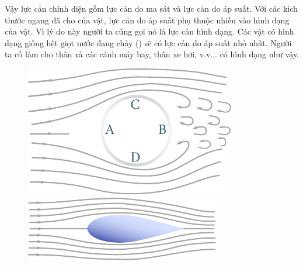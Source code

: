 
Vậy lực cản chính diện gồm lực cản do ma sát và lực cản do áp suất. Với các kích thước ngang đã cho của vật, lực cản do áp suất phụ thuộc nhiều vào hình dạng của vật. Vì lý do này người ta cũng gọi nó là lực cản hình dạng. Các vật có hình dạng giống hệt giọt nước đang chảy () sẽ có lực cản do áp suất nhỏ nhất. Người ta cố làm cho thân và các cánh máy bay, thân xe hơi, v.v... có hình dạng như vậy.

\begin{figure}[!htb]
	\begin{minipage}[t]{0.5\linewidth}
		\begin{center}
			\includegraphics[scale=1.0]{figures/ch_09/fig_9_16.pdf}
			\caption[]{}
			\label{fig:9_16}
		\end{center}
	\end{minipage}
	\hspace{-0.0cm}
	\begin{minipage}[t]{0.5\linewidth}
		\begin{center}
			\includegraphics[scale=1.0]{figures/ch_09/fig_9_17.pdf}
			\caption[]{}
			\label{fig:9_17}
		\end{center}
	\end{minipage}
	\vspace{-0.5cm}
\end{figure}

